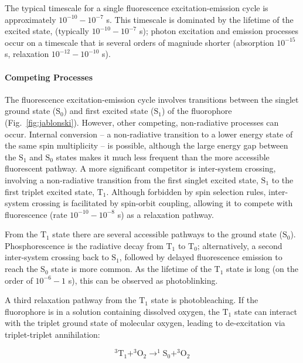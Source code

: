 The typical timescale for a single fluorescence excitation-emission cycle is approximately $10^{-10} - 10^{-7}$ s. This timescale is dominated by the lifetime of the excited state, (typically $10^{-10} - 10^{-7}$ s); photon excitation and emission processes occur on a timescale that is several orders of magniude shorter (absorption $10^{-15}$ s, relaxation $10^{-12} - 10^{-10}$ s).
 
\paragraph{Competing Processes}
The fluorescence excitation-emission cycle involves transitions between the singlet ground state ($\text{S}_0$) and first excited state ($\text{S}_1$) of the fluorophore (Fig.~\ref{fig:jablonski}). However, other competing, non-radiative processes can occur. Internal conversion -- a non-radiative transition to a lower energy state of the same spin multiplicity -- is possible, although the large energy gap between the $\text{S}_1$ and $\text{S}_0$ states makes it much less frequent than the more accessible fluorescent pathway. A more significant competitor is inter-system crossing, involving a non-radiative transition from the first singlet excited state, $\text{S}_1$ to the first triplet excited state, $\text{T}_1$. Although forbidden by spin selection rules, inter-system crossing is facilitated by spin-orbit coupling, allowing it to compete with fluorescence (rate $10^{-10} - 10^{-8}$ s) as a relaxation pathway.

From the $\text{T}_1$ state there are several accessible pathways to the ground state ($\text{S}_0$). Phosphorescence is the radiative decay from $\text{T}_1$ to $\text{T}_0$; alternatively, a second inter-system crossing back to $\text{S}_1$, followed by delayed fluorescence emission to reach the $\text{S}_0$ state is more common. As the lifetime of the $\text{T}_1$ state is long (on the order of $10^{-6} - 1$ s), this can be observed as photoblinking.  

A third relaxation pathway from the $\text{T}_1$ state is photobleaching. If the fluorophore is in a solution containing dissolved oxygen, the $\text{T}_1$ state can interact with the triplet ground state of molecular oxygen, leading to de-excitation via triplet-triplet annihilation:

\begin{equation}
^3\text{T}_1 + ^3\text{O}_2 \longrightarrow ^1\text{S}_0 + ^3\text{O}_2
\label{eq:blinking1}
\end{equation} 

